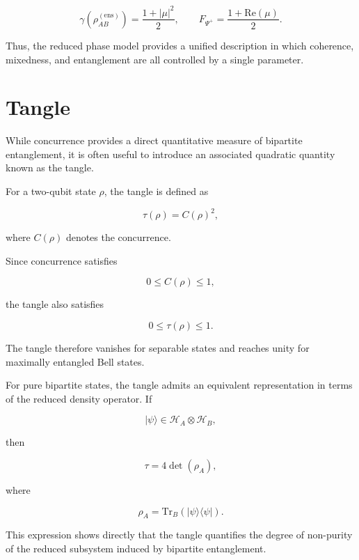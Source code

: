 \[
\gamma
\left(
\rho_{AB}^{(\mathrm{ens})}
\right)
=
\frac{1+|\mu|^2}{2},
\qquad
F_{\Psi^+}
=
\frac{1+\mathrm{Re}(\mu)}{2}.
\]

Thus, the reduced phase model provides a unified description in which coherence, mixedness, and entanglement are all controlled by a single parameter.


\section{Tangle}

While concurrence provides a direct quantitative measure of bipartite entanglement, it is often useful to introduce an associated quadratic quantity known as the tangle.

For a two-qubit state \( \rho \), the tangle is defined as

\begin{equation}
\tau(\rho)
=
C(\rho)^2,
\label{eq:tangle_definition}
\end{equation}

where \( C(\rho) \) denotes the concurrence.

\medskip

Since concurrence satisfies

\[
0
\leq
C(\rho)
\leq
1,
\]

the tangle also satisfies

\[
0
\leq
\tau(\rho)
\leq
1.
\]

The tangle therefore vanishes for separable states and reaches unity for maximally entangled Bell states.

\medskip

For pure bipartite states, the tangle admits an equivalent representation in terms of the reduced density operator. If

\[
|\psi\rangle
\in
\mathcal{H}_A
\otimes
\mathcal{H}_B,
\]

then

\begin{equation}
\tau
=
4
\det(\rho_A),
\label{eq:tangle_reduced_density_operator}
\end{equation}

where

\[
\rho_A
=
\mathrm{Tr}_B
\left(
|\psi\rangle
\langle\psi|
\right).
\]

This expression shows directly that the tangle quantifies the degree of non-purity of the reduced subsystem induced by bipartite entanglement.

